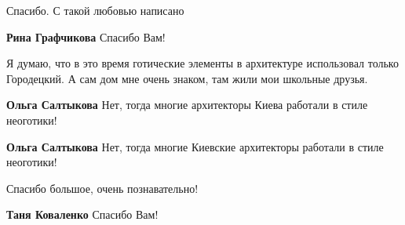 \begin{itemize}
Спасибо. С такой любовью написано

\textbf{Рина Графчикова} Спасибо Вам!


Я думаю, что в это время готические элементы в архитектуре использовал только
Городецкий. А сам дом мне очень знаком, там жили мои школьные друзья.

\textbf{Ольга Салтыкова} Нет, тогда многие архитекторы Киева работали в стиле неоготики!

\textbf{Ольга Салтыкова} Нет, тогда многие Киевские архитекторы работали в стиле неоготики!

Спасибо большое, очень познавательно!

\textbf{Таня Коваленко} Спасибо Вам!

\end{itemize} %
